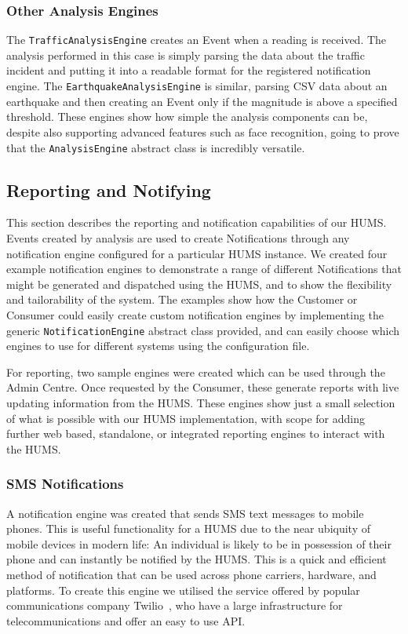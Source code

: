 \documentclass[10pt,a4paper]{article}
\begin{document}
\subsubsection{Other Analysis Engines}
The \texttt{TrafficAnalysisEngine} creates an Event when a reading is received. The analysis performed in this case is simply parsing the data about the traffic incident and putting it into a readable format for the registered notification engine. The \texttt{EarthquakeAnalysisEngine} is similar, parsing CSV data about an earthquake and then creating an Event only if the magnitude is above a specified threshold. These engines show how simple the analysis components can be, despite also supporting advanced features such as face recognition, going to prove that the \texttt{AnalysisEngine} abstract class is incredibly versatile.

\subsection{Reporting and Notifying}
\label{sec:reporting}
This section describes the reporting and notification capabilities of our HUMS. Events created by analysis are used to create Notifications through any notification engine configured for a particular HUMS instance. We created four example notification engines to demonstrate a range of different Notifications that might be generated and dispatched using the HUMS, and to show the flexibility and tailorability of the system. The examples show how the Customer or Consumer could easily create custom notification engines by implementing the generic \texttt{NotificationEngine} abstract class provided, and can easily choose which engines to use for different systems using the configuration file.

For reporting, two sample engines were created which can be used through the Admin Centre. Once requested by the Consumer, these generate reports with live updating information from the HUMS. These engines show just a small selection of what is possible with our HUMS implementation, with scope for adding further web based, standalone, or integrated reporting engines to interact with the HUMS.

\subsubsection{SMS Notifications}
A notification engine was created that sends SMS text messages to mobile phones. This is useful functionality for a HUMS due to the near ubiquity of mobile devices in modern life: An individual is likely to be in possession of their phone and can instantly be notified by the HUMS. This is a quick and efficient method of notification that can be used across phone carriers, hardware, and platforms. To create this engine we utilised the service offered by popular communications company Twilio~\cite{twilio}, who have a large infrastructure for telecommunications and offer an easy to use API.
\end{document}
